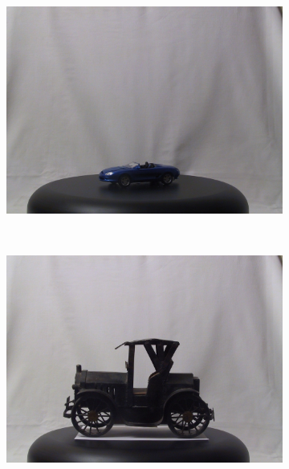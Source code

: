 \documentclass[10pt,twocolumn,letterpaper]{article}
\begin{document}
\begin{figure}[htb]
\begin{subfigure}[t]{0.15\columnwidth}
    \end{subfigure}%
    ~ %
    \begin{subfigure}[t]{0.15\columnwidth}
        \centering
        \includegraphics[width=1\columnwidth]{images/3d/3}
    \end{subfigure}%
    ~ %
    \begin{subfigure}[t]{0.15\columnwidth}
        \centering
        \includegraphics[width=1\columnwidth]{images/3d/4}
    \end{subfigure}%
    ~ %
    \begin{subfigure}[t]{0.15\columnwidth}
        \centering

\end{subfigure}
\end{figure}
\end{document}
